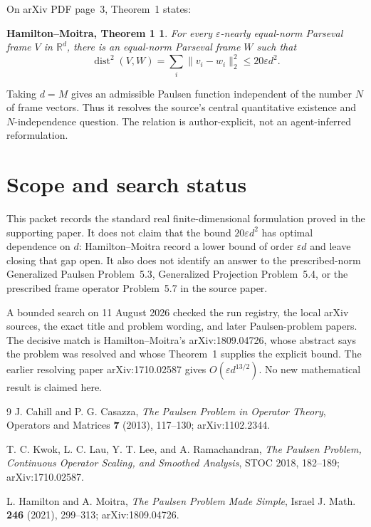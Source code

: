 \documentclass[11pt]{article}
\newtheorem*{answer}{Hamilton--Moitra, Theorem 1}
\begin{document}
On arXiv PDF page~3, Theorem~1 states:

\begin{answer}
For every $\varepsilon$-nearly equal-norm Parseval frame $V$ in
$\mathbb{R}^{d}$, there is an equal-norm Parseval frame $W$ such that
\[
  \operatorname{dist}^{2}(V,W)
  =\sum_i\lVert v_i-w_i\rVert_2^2
  \leq 20\varepsilon d^{2}.
\]
\end{answer}

Taking $d=M$ gives an admissible Paulsen function independent of the number
$N$ of frame vectors.  Thus it resolves the source's central quantitative
existence and $N$-independence question.  The relation is author-explicit,
not an agent-inferred reformulation.

\section*{Scope and search status}

This packet records the standard real finite-dimensional formulation proved
in the supporting paper.  It does not claim that the bound
$20\varepsilon d^{2}$ has optimal dependence on $d$: Hamilton--Moitra record
a lower bound of order $\varepsilon d$ and leave closing that gap open.  It
also does not identify an answer to the prescribed-norm Generalized Paulsen
Problem~5.3, Generalized Projection Problem~5.4, or the prescribed frame
operator Problem~5.7 in the source paper.

A bounded search on 11 August 2026 checked the run registry, the local arXiv
sources, the exact title and problem wording, and later Paulsen-problem papers.
The decisive match is Hamilton--Moitra's arXiv:1809.04726, whose abstract says
the problem was resolved and whose Theorem~1 supplies the explicit bound.
The earlier resolving paper arXiv:1710.02587 gives
$O(\varepsilon d^{13/2})$.  No new mathematical result is claimed here.

\begin{thebibliography}{9}
J. Cahill and P. G. Casazza,
\emph{The Paulsen Problem in Operator Theory},
Operators and Matrices \textbf{7} (2013), 117--130;
arXiv:1102.2344.

T. C. Kwok, L. C. Lau, Y. T. Lee, and A. Ramachandran,
\emph{The Paulsen Problem, Continuous Operator Scaling, and Smoothed Analysis},
STOC 2018, 182--189; arXiv:1710.02587.

L. Hamilton and A. Moitra,
\emph{The Paulsen Problem Made Simple},
Israel J. Math. \textbf{246} (2021), 299--313;
arXiv:1809.04726.
\end{thebibliography}
\end{document}
